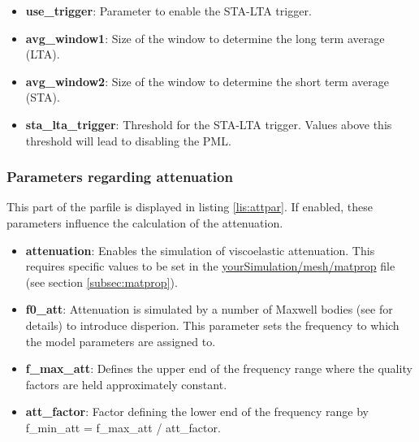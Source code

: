 			\begin{itemize}
				\item \textbf{use\_trigger}: Parameter to enable the STA-LTA trigger. 
				\item \textbf{avg\_window1}: Size of the window to determine the long term average (LTA).
				\item \textbf{avg\_window2}: Size of the window to determine the short term average (STA).
				\item \textbf{sta\_lta\_trigger}: Threshold for the STA-LTA trigger. Values above this threshold will lead to disabling the PML.
			\end{itemize}
			
		\subsubsection{Parameters regarding attenuation}
			This part of the parfile is displayed in listing \ref{lis:attpar}. If enabled, these parameters influence the calculation of the attenuation.
			
    		\begin{itemize}
    			\item \textbf{attenuation}: Enables the simulation of viscoelastic attenuation. This requires specific values to be set in the \url{yourSimulation/mesh/matprop} file (see section \ref{subsec:matprop}).
    			\item \textbf{f0\_att}: Attenuation is simulated by a number of Maxwell bodies (see \cite{Lambrecht.2015} for details) to introduce disperion. This parameter sets the frequency to which the model parameters are assigned to.
				\item \textbf{f\_max\_att}: Defines the upper end of the frequency range where the quality factors are held approximately constant.
				\item \textbf{att\_factor}: Factor defining the lower end of the frequency range by f\_min\_att = f\_max\_att / att\_factor.
    		\end{itemize}
    		
